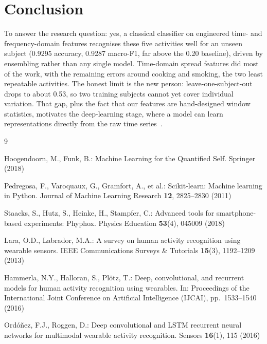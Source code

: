 \documentclass[runningheads]{llncs}
\begin{document}
\section{Conclusion}
\label{sec:conclusion}

To answer the research question: yes, a classical classifier on engineered time- and frequency-domain features recognises these five activities well for an unseen subject (0.9295 accuracy, 0.9287 macro-F1, far above the 0.20 baseline), driven by ensembling rather than any single model. Time-domain spread features did most of the work, with the remaining errors around cooking and smoking, the two least repeatable activities. The honest limit is the new person: leave-one-subject-out drops to about 0.53, so two training subjects cannot yet cover individual variation. That gap, plus the fact that our features are hand-designed window statistics, motivates the deep-learning stage, where a model can learn representations directly from the raw time series~\cite{ordonez2016}.


\begin{thebibliography}{9}

Hoogendoorn, M., Funk, B.: Machine Learning for the Quantified Self. Springer (2018)

Pedregosa, F., Varoquaux, G., Gramfort, A., et al.: Scikit-learn: Machine learning in Python.
Journal of Machine Learning Research \textbf{12}, 2825--2830 (2011)

Staacks, S., Hutz, S., Heinke, H., Stampfer, C.: Advanced tools for smartphone-based experiments: Phyphox.
Physics Education \textbf{53}(4), 045009 (2018)

Lara, O.D., Labrador, M.A.: A survey on human activity recognition using wearable sensors.
IEEE Communications Surveys \& Tutorials \textbf{15}(3), 1192--1209 (2013)

Hammerla, N.Y., Halloran, S., Pl\"otz, T.: Deep, convolutional, and recurrent models for human activity recognition using wearables.
In: Proceedings of the International Joint Conference on Artificial Intelligence (IJCAI), pp.~1533--1540 (2016)

Ord\'o\~nez, F.J., Roggen, D.: Deep convolutional and LSTM recurrent neural networks for multimodal wearable activity recognition.
Sensors \textbf{16}(1), 115 (2016)

\end{thebibliography}
\end{document}
